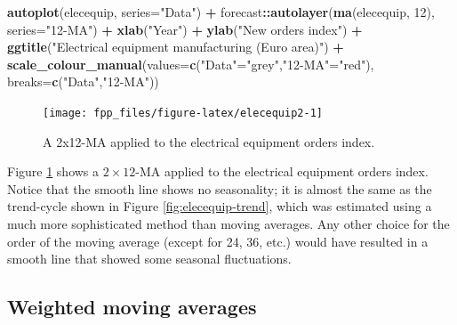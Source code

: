 \documentclass[]{book}
\newenvironment{Shaded}{\begin{snugshade}}{\end{snugshade}}
\newcommand{\DataTypeTok}[1]{\textcolor[rgb]{0.13,0.29,0.53}{#1}}
\newcommand{\DecValTok}[1]{\textcolor[rgb]{0.00,0.00,0.81}{#1}}
\newcommand{\KeywordTok}[1]{\textcolor[rgb]{0.13,0.29,0.53}{\textbf{#1}}}
\newcommand{\NormalTok}[1]{#1}
\newcommand{\OperatorTok}[1]{\textcolor[rgb]{0.81,0.36,0.00}{\textbf{#1}}}
\newcommand{\StringTok}[1]{\textcolor[rgb]{0.31,0.60,0.02}{#1}}
\begin{document}
\begin{Shaded}
\begin{Highlighting}[]
\KeywordTok{autoplot}\NormalTok{(elecequip, }\DataTypeTok{series=}\StringTok{"Data"}\NormalTok{) }\OperatorTok{+}
\StringTok{  }\NormalTok{forecast}\OperatorTok{::}\KeywordTok{autolayer}\NormalTok{(}\KeywordTok{ma}\NormalTok{(elecequip, }\DecValTok{12}\NormalTok{), }\DataTypeTok{series=}\StringTok{"12-MA"}\NormalTok{) }\OperatorTok{+}
\StringTok{  }\KeywordTok{xlab}\NormalTok{(}\StringTok{"Year"}\NormalTok{) }\OperatorTok{+}\StringTok{ }\KeywordTok{ylab}\NormalTok{(}\StringTok{"New orders index"}\NormalTok{) }\OperatorTok{+}
\StringTok{  }\KeywordTok{ggtitle}\NormalTok{(}\StringTok{"Electrical equipment manufacturing (Euro area)"}\NormalTok{) }\OperatorTok{+}
\StringTok{  }\KeywordTok{scale_colour_manual}\NormalTok{(}\DataTypeTok{values=}\KeywordTok{c}\NormalTok{(}\StringTok{"Data"}\NormalTok{=}\StringTok{"grey"}\NormalTok{,}\StringTok{"12-MA"}\NormalTok{=}\StringTok{"red"}\NormalTok{),}
    \DataTypeTok{breaks=}\KeywordTok{c}\NormalTok{(}\StringTok{"Data"}\NormalTok{,}\StringTok{"12-MA"}\NormalTok{))}
\end{Highlighting}
\end{Shaded}

\begin{figure}

{\centering \texttt{[image: fpp\_files/figure-latex/elecequip2-1]} 

}

\caption{A 2x12-MA applied to the electrical equipment orders index.}\label{fig:elecequip2}
\end{figure}

Figure \ref{fig:elecequip2} shows a \(2\times12\)-MA applied to the electrical equipment orders index. Notice that the smooth line shows no seasonality; it is almost the same as the trend-cycle shown in Figure \ref{fig:elecequip-trend}, which was estimated using a much more sophisticated method than moving averages. Any other choice for the order of the moving average (except for 24, 36, etc.) would have resulted in a smooth line that showed some seasonal fluctuations.

\hypertarget{weighted-moving-averages}{%
\subsection*{Weighted moving averages}\label{weighted-moving-averages}}
\end{document}
